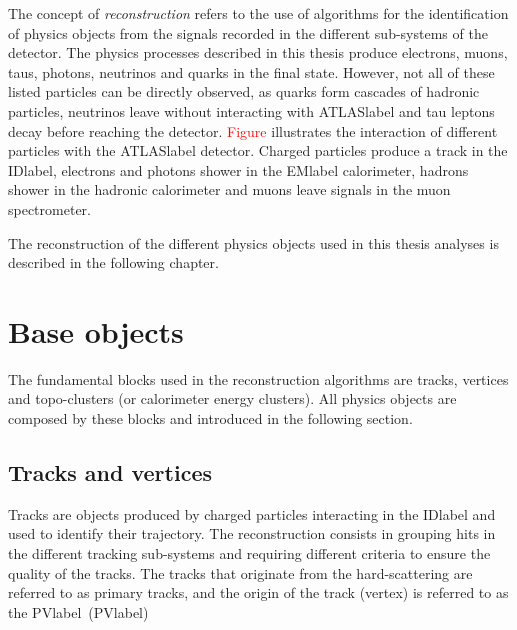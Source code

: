 The concept of \textit{reconstruction} refers to the use of algorithms for the identification of physics objects from the signals recorded in the different sub-systems of the detector. The physics processes described in this thesis produce electrons, muons, taus, photons, neutrinos and quarks in the final state. However, not all of these listed particles can be directly observed, as quarks form cascades of hadronic particles, neutrinos leave without interacting with \acrshort{ATLASlabel} and tau leptons decay before reaching the detector. \textcolor{red}{Figure} illustrates the interaction of different particles with the \acrshort{ATLASlabel} detector. Charged particles produce a track in the \acrshort{IDlabel}, electrons and photons shower in the \acrshort{EMlabel} calorimeter, hadrons shower in the hadronic calorimeter and muons leave signals in the muon spectrometer.

The reconstruction of the different physics objects used in this thesis analyses is described in the following chapter.

\section{Base objects}

The fundamental blocks used in the reconstruction algorithms are tracks, vertices and topo-clusters (or calorimeter energy clusters). All physics objects are composed by these blocks and introduced in the following section.

\subsection{Tracks and vertices}

Tracks are objects produced by charged particles interacting in the \acrshort{IDlabel} and used to identify their trajectory. The reconstruction consists in grouping hits in the different tracking sub-systems and requiring different criteria to ensure the quality of the tracks. The tracks that originate from the hard-scattering are referred to as primary tracks, and the origin of the track (vertex) is referred to as the  \acrfull{PVlabel}~(\acrshort{PVlabel})

